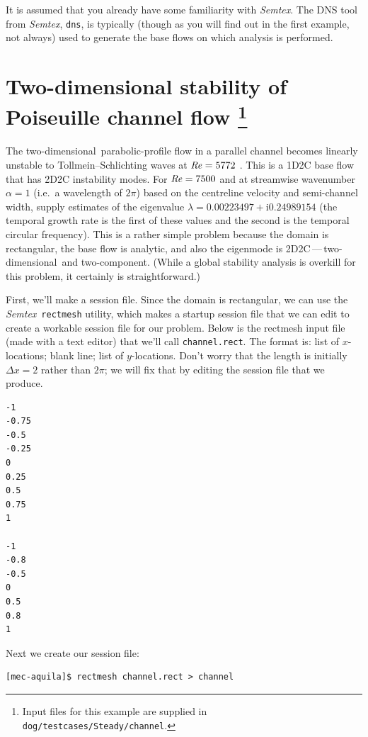 \documentclass[11pt,a4paper]{report}
\newcommand\Rey{\mbox{\textit{Re}}}
\newcommand\ci{\mathrm{i}}
\newcommand\twod{two-di\-men\-sion\-al}
\newcommand\twoc{two-com\-po\-nent}
\newcommand{\ie}{i.e.\ }
\newcommand{\Semtex}{\emph{Semtex}}
\begin{document}
It is assumed that you already have some familiarity with \Semtex.
The DNS tool from \Semtex, \texttt{dns}, is typically (though as you
will find out in the first example, not always) used to generate the
base flows on which analysis is performed.


\section{Two-dimensional stability of Poiseuille channel flow
\protect\footnote{Input files for this example are supplied in
\texttt{dog/testcases/Steady/channel}.}
}
\label{sec.chan2d}

The \twod\ parabolic-profile flow in a parallel channel becomes
linearly unstable to Tollmein--Schlichting waves at $\Rey=5772$
\citep{ors71}.  This is a 1D2C base flow that has 2D2C instability
modes. For $\Rey=7500$ and at streamwise wavenumber $\alpha=1$ (\ie a
wavelength of $2\pi$) based on the centreline velocity and
semi-channel width, \citet[\S\,1.4]{chqz88} supply estimates of the
eigenvalue $\lambda=0.00223497+\ci 0.24989154$ (the temporal growth
rate is the first of these values and the second is the temporal
circular frequency).  This is a rather simple problem because the
domain is rectangular, the base flow is analytic, and also the
eigenmode is 2D2C\,---\,\twod\ and \twoc.  (While a global stability
analysis is overkill for this problem, it certainly is
straightforward.)

First, we'll make a session file. Since the domain is rectangular, we
can use the \Semtex\ \verb+rectmesh+ utility, which makes a startup
session file that we can edit to create a workable session file for
our problem.  Below is the rectmesh input file (made with a text
editor) that we'll call \verb+channel.rect+.  The format is: list of
$x$-locations; blank line; list of $y$-locations.  Don't worry that
the length is initially $\Delta x=2$ rather than $2\pi$; we will fix
that by editing the session file that we produce.

{\small
\begin{verbatim}
-1
-0.75
-0.5
-0.25
0
0.25
0.5
0.75
1

-1
-0.8
-0.5
0
0.5
0.8
1
\end{verbatim}
}

Next we create our session file:
{\small
\begin{verbatim}
[mec-aquila]$ rectmesh channel.rect > channel
\end{verbatim}
}
\end{document}
